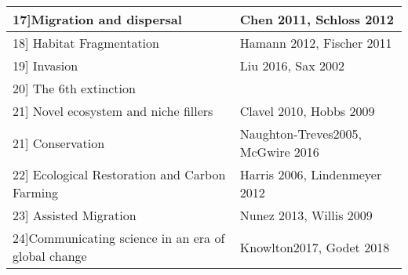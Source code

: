 \documentclass{article}\usepackage[]{graphicx}\usepackage[]{color}
\begin{document}
{\begin{center}
\begin{tabular}{|l|l|}
\hline
17]Migration and dispersal & Chen 2011, Schloss 2012 \\
\hline
18] Habitat Fragmentation & Hamann 2012, Fischer 2011 \\
\hline
19] Invasion & Liu 2016, Sax 2002\\
\hline
20] The 6th extinction & \\
\hline
21] Novel ecosystem and niche fillers & Clavel 2010, Hobbs 2009\\
\hline
21] Conservation & Naughton-Treves2005, McGwire 2016\\
\hline
22] Ecological Restoration and Carbon Farming & Harris 2006, Lindenmeyer 2012\\
\hline
23] Assisted Migration &  Nunez 2013, Willis 2009\\
\hline
24]Communicating science in an era of global change & Knowlton2017, Godet 2018\\
\hline

\end{tabular}
\end{center}}
\nocite{Anthony_2008,Arnfield_2003,Clavel_2011,Cleland_2012,Colwell_2008,Cox_2000,Knoll_2007,Deutsch_2008,Diaz_2008,Foley_2005,Grimm_2008,Hamann_2012,Harris_2006,Hof_2011,IPCC_2014,Joppa_2009,Jump_2006,Khaliq_2014,Korner_2006,Kroeker_2013,Lindenmayer_2012,Liu_2017,Mantyka_pringle_2011,Naughton_Treves_2005,Poorter_2003,Riley_2006,Sabine_2004,Sax_2002,Schindler_2008,Schloss_2012,Schneider_2009,Seto_2010,Willis_2009,Nunez_2013, McGuire_2016, Chen_2011, Fischer_2007, Knowlton_2017,Godet_2018}


\end{document}
